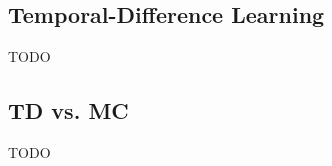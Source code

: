 \subsection{Temporal-Difference Learning}\label{subsec:temporal-difference-learning}
TODO
%
%
%

\subsection{TD vs. MC}
TODO
%
%

